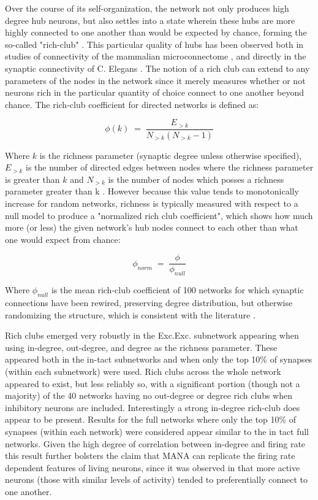 \documentclass[10pt,letterpaper]{article}
\begin{document}
Over the course of its self-organization, the network not only produces high degree hub neurons, but also settles into a state wherein these hubs are more highly connected to one another than would be expected by chance, forming the so-called "rich-club" \cite{colizza2006detecting}. This particular quality of hubs has been observed both in studies of connectivity of the mammalian microconnectome \cite{harriger2012rich}\cite{schroeter2015emergence}\cite{nigam2016}, and directly in the synaptic connectivity of C. Elegans \cite{towlson2013rich}. The notion of a rich club can extend to any parameters of the nodes in the network since it merely measures whether or not neurons rich in the particular quantity of choice connect to one another beyond chance. The rich-club coefficient for directed networks is defined as:
	
$$ \phi(k) \;=\; \frac{E_{>k}}{N_{>k}(N_{>k}-1)} $$
	
Where $k$ is the richness parameter (synaptic degree unless otherwise specified), $E_{>k}$ is the number of directed edges between nodes where the richness parameter is greater than $k$ and $N_{>k}$ is the number of nodes which posses a richness parameter greater than k \cite{colizza2006detecting}\cite{smilkov2010rich}. However because this value tends to monotonically increase for random networks, richness is typically measured with respect to a null model to produce a "normalized rich club coefficient", which shows how much more (or less) the given network's hub nodes connect to each other than what one would expect from chance:
	
$$\phi_{norm} \;=\; \frac{\phi}{\phi_{null}}$$
	
Where $\phi_{null}$ is the mean rich-club coefficient of 100 networks for which synaptic connections have been rewired, preserving degree distribution, but otherwise randomizing the structure, which is consistent with the literature \cite{colizza2006detecting}. 
	
Rich clubs emerged very robustly in the Exc.\textrightarrow Exc. subnetwork appearing when using in-degree, out-degree, and degree as the richness parameter. These appeared both in the in-tact subnetworks and when only the top 10\% of synapses (within each subnetwork) were used. Rich clubs across the whole network appeared to exist, but less reliably so, with a significant portion (though not a majority) of the 40 networks having no out-degree or degree rich clubs when inhibitory neurons are included. Interestingly a strong in-degree rich-club does appear to be present. Results for the full networks where only the top 10\% of synapses (within each network) were considered appear similar to the in tact full networks. Given the high degree of correlation between in-degree and firing rate this result further bolsters the claim that MANA can replicate the firing rate dependent features of living neurons, since it was observed in \cite{yassin2010embedded} that more active neurons (those with similar levels of activity) tended to preferentially connect to one another. 
\end{document}
